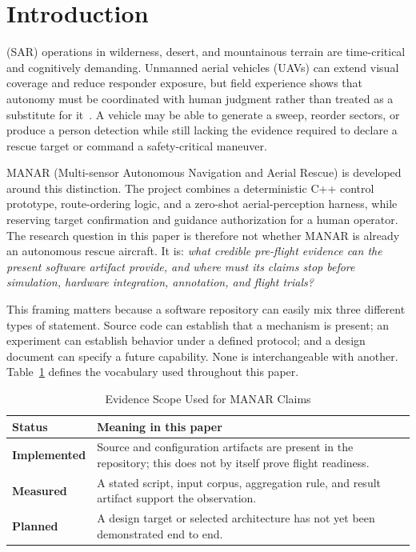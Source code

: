 \section{Introduction}

 (SAR) operations in wilderness, desert, and mountainous terrain are time-critical and cognitively demanding. Unmanned aerial vehicles (UAVs) can extend visual coverage and reduce responder exposure, but field experience shows that autonomy must be coordinated with human judgment rather than treated as a substitute for it~\cite{goodrich2008towards,silvagni2017multipurpose,alotaibi2019lsar}. A vehicle may be able to generate a sweep, reorder sectors, or produce a person detection while still lacking the evidence required to declare a rescue target or command a safety-critical maneuver.

MANAR (Multi-sensor Autonomous Navigation and Aerial Rescue) is developed around this distinction. The project combines a deterministic C++ control prototype, route-ordering logic, and a zero-shot aerial-perception harness, while reserving target confirmation and guidance authorization for a human operator. The research question in this paper is therefore not whether MANAR is already an autonomous rescue aircraft. It is: \emph{what credible pre-flight evidence can the present software artifact provide, and where must its claims stop before simulation, hardware integration, annotation, and flight trials?}

This framing matters because a software repository can easily mix three different types of statement. Source code can establish that a mechanism is present; an experiment can establish behavior under a defined protocol; and a design document can specify a future capability. None is interchangeable with another. Table~\ref{tab:evidence_scope} defines the vocabulary used throughout this paper.

\begin{table}[t]
\caption{Evidence Scope Used for MANAR Claims}
\label{tab:evidence_scope}
\centering
\footnotesize
\begin{tabularx}{\columnwidth}{@{}lX@{}}
\toprule
\textbf{Status} & \textbf{Meaning in this paper} \\
\midrule
\textbf{Implemented} & Source and configuration artifacts are present in the repository; this does not by itself prove flight readiness. \\
\textbf{Measured} & A stated script, input corpus, aggregation rule, and result artifact support the observation. \\
\textbf{Planned} & A design target or selected architecture has not yet been demonstrated end to end. \\
\bottomrule
\end{tabularx}
\end{table}

